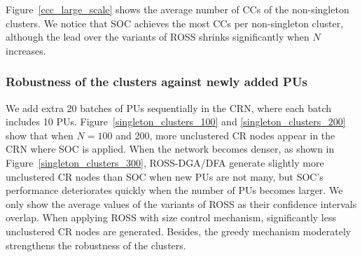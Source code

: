 \documentclass[10pt,journal,compsoc]{IEEEtran}
\theoremstyle{mytheoremstyle}
\theoremstyle{mytheoremstyle}
\theoremstyle{mytheoremstyle}
\newcommand{\ie}{i.e., }
\begin{document}
Figure~\ref{ccc_large_scale} shows the average number of CCs of the non-singleton clusters.
We notice that SOC achieves the most CCs per non-singleton cluster, although the lead over the variants of ROSS shrinks significantly when $N$ increases.




\subsubsection{Robustness of the clusters against newly added PUs}
We add extra 20 batches of PUs sequentially in the CRN, where each batch includes 10 PUs. 
Figure~\ref{singleton_clusters_100} and \ref{singleton_clusters_200} show that when $N=100$ and 200, more unclustered CR nodes appear in the CRN where SOC is applied.
When the network becomes denser, as shown in Figure~\ref{singleton_clusters_300}, ROSS-DGA/DFA generate slightly more unclustered CR nodes than SOC when new PUs are not many, but SOC's performance deteriorates quickly when the number of PUs becomes larger.
We only show the average values of the variants of ROSS as their confidence intervals overlap.
%
When applying ROSS with size control mechanism, significantly less unclustered CR nodes are generated.
Besides, the greedy mechanism moderately strengthens the robustness of the clusters.
\end{document}
